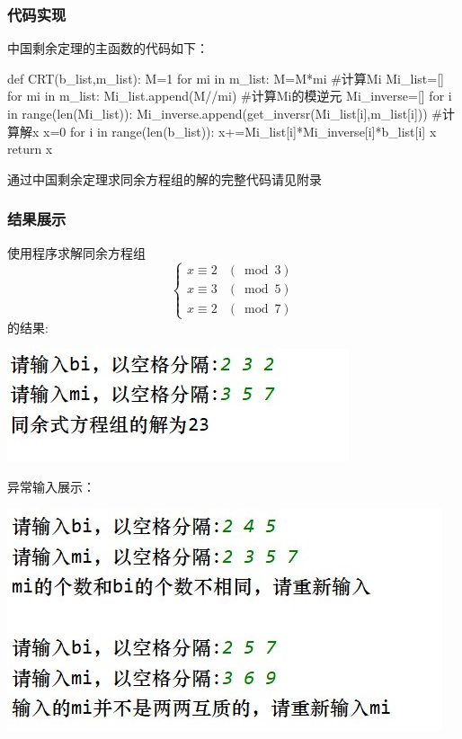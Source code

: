 \documentclass[UTF8]{ctexart}
\begin{document}
\subsubsection{代码实现}
\par 中国剩余定理的主函数的代码如下：
\begin{python}
def CRT(b_list,m_list):
  M=1
  for mi in m_list:
      M=M*mi
  #计算Mi
  Mi_list=[]
  for mi in m_list:
      Mi_list.append(M//mi)
  #计算Mi的模逆元
  Mi_inverse=[]
  for i in range(len(Mi_list)):
      Mi_inverse.append(get_inversr(Mi_list[i],m_list[i]))
  #计算解x
  x=0
  for i in range(len(b_list)):
      x+=Mi_list[i]*Mi_inverse[i]*b_list[i]
      x%
  return x
\end{python}
\par 通过中国剩余定理求同余方程组的解的完整代码请见附录
\subsubsection{结果展示}
\par 使用程序求解同余方程组
\[\begin{cases}x \equiv 2 & (\bmod 3) \\ x \equiv 3 & (\bmod 5) \\ x \equiv 2 & (\bmod 7)\end{cases}\]
的结果:\\
\par
\includegraphics[width=.6\textwidth]{3.3.jpg}
\par 异常输入展示：

\par
\includegraphics[width=.7\textwidth]{3.4.jpg}
\end{document}
